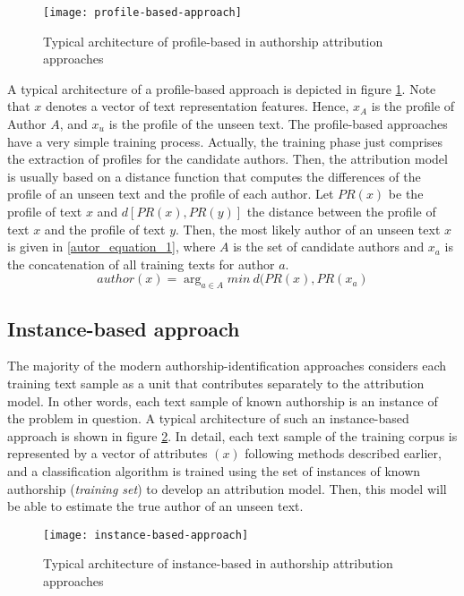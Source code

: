 \begin{figure}[ht]
	\centering
	\texttt{[image: profile-based-approach]}
	\caption[Profile-based approach]{Typical architecture of profile-based in authorship attribution approaches \cite{stamatatos2009survey}}
	\label{fig:profile_based_approach}
\end{figure}

A typical architecture of a profile-based approach is depicted in figure  \ref{fig:profile_based_approach}. Note that $x$ denotes a vector of text representation
features. Hence, $x_A$ is the profile of Author $A$, and $x_u$ is the
profile of the unseen text.
The profile-based approaches have a very simple training process. Actually, the training phase just comprises the extraction of profiles for the candidate authors. Then, the attribution model is usually based on a distance function that computes the differences of the profile of an unseen text and the profile of each author. Let $PR(x)$ be the profile of text $x$ and $d[PR(x),PR(y)]$ the distance between the profile of text $x$ and the profile of text $y$. Then, the most likely author of an unseen text $x$ is given in \ref{autor_equation_1}, where $A$ is the set of candidate authors and $x_a$ is the concatenation of all training texts for author $a$.
\begin{equation}\label{autor_equation_1}
author(x) = \arg_{a \in A} min\ d(PR(x), PR(x_a)
\end{equation}


\subsection{Instance-based approach}

The majority of the modern authorship-identification approaches considers each training text sample as a unit that contributes separately to the attribution model. In other words, each text sample of known authorship is an instance of the problem in question. A typical architecture of such an instance-based approach is shown in figure  \ref{fig:instance_based_approach}. In detail, each text sample of the training corpus is represented by a vector of attributes $(x)$ following methods described earlier, and a
classification algorithm is trained using the set of instances of known authorship (\textit{training set}) to develop an attribution model. Then, this model will be able to estimate the true author of an unseen text.

\begin{figure}[ht]
	\centering
	\texttt{[image: instance-based-approach]}
	\caption[Instance-based approach]{Typical architecture of instance-based in authorship attribution approaches \cite{stamatatos2009survey}}
	\label{fig:instance_based_approach}
\end{figure}


